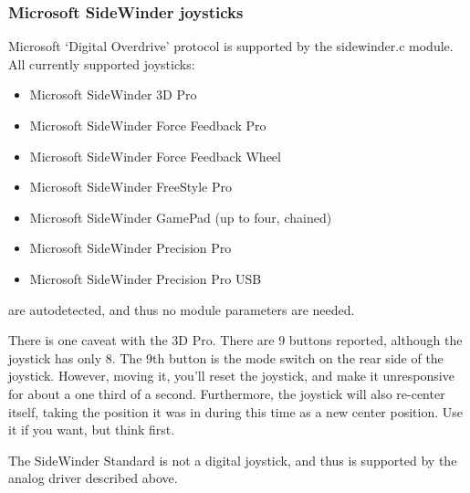 \documentclass[a4paper,8pt,english]{sphinxmanual}
\begin{document}
\subsubsection{Microsoft SideWinder joysticks}
\label{input/joydev/joystick:microsoft-sidewinder-joysticks}
Microsoft `Digital Overdrive' protocol is supported by the sidewinder.c
module. All currently supported joysticks:
\begin{itemize}
\item {} 
Microsoft SideWinder 3D Pro

\item {} 
Microsoft SideWinder Force Feedback Pro

\item {} 
Microsoft SideWinder Force Feedback Wheel

\item {} 
Microsoft SideWinder FreeStyle Pro

\item {} 
Microsoft SideWinder GamePad (up to four, chained)

\item {} 
Microsoft SideWinder Precision Pro

\item {} 
Microsoft SideWinder Precision Pro USB

\end{itemize}

are autodetected, and thus no module parameters are needed.

There is one caveat with the 3D Pro. There are 9 buttons reported,
although the joystick has only 8. The 9th button is the mode switch on the
rear side of the joystick. However, moving it, you'll reset the joystick,
and make it unresponsive for about a one third of a second. Furthermore, the
joystick will also re-center itself, taking the position it was in during
this time as a new center position. Use it if you want, but think first.

The SideWinder Standard is not a digital joystick, and thus is supported
by the analog driver described above.
\end{document}
